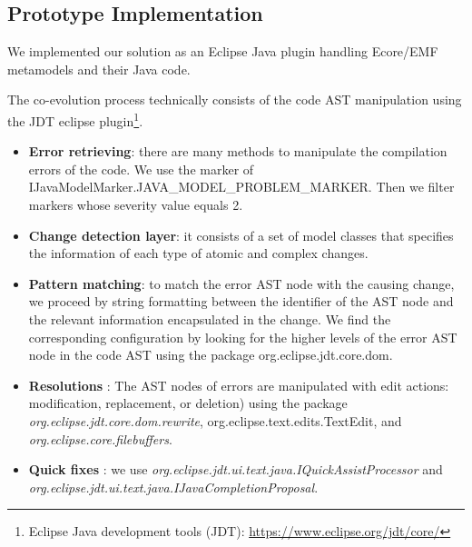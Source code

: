 
\subsection{Prototype Implementation}
We implemented our solution as an Eclipse Java plugin handling Ecore/EMF metamodels and their Java code. 

The co-evolution process technically consists of the code AST manipulation using the JDT eclipse plugin\footnote{Eclipse Java development tools (JDT): \url{https://www.eclipse.org/jdt/core/}}.
\begin{itemize}
\item \textbf{Error retrieving}: there are many methods to manipulate the compilation errors of the code. We use the marker of IJavaModelMarker.JAVA\_MODEL\_PROBLEM\_MARKER. Then we filter markers whose severity value equals 2.
\item \textbf{Change detection layer}: it consists of a set of model classes that specifies the information of each type of atomic and complex changes. 
\item \textbf{Pattern matching}: to match the error AST node with the causing change, we proceed by string formatting between the identifier of the AST node and the relevant information encapsulated in the change. We find the corresponding configuration by looking for the higher levels of the error AST node in the code AST using the package org.eclipse.jdt.core.dom.
\item \textbf{Resolutions} :
The AST nodes of errors are manipulated with edit actions: modification, replacement, or deletion)  
using the package \textit{ org.eclipse.jdt.core.dom.rewrite}, org.eclipse.text.edits.TextEdit, and \textit{org.eclipse.core.filebuffers}. 
\item \textbf{Quick fixes} : we use \textit{org.eclipse.jdt.ui.text.java.IQuickAssistProcessor} and \textit{org.eclipse.jdt.ui.text.java.IJavaCompletionProposal}.

\end{itemize}

